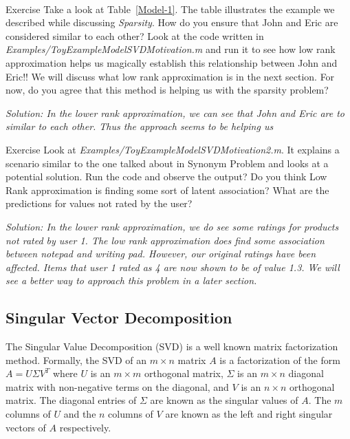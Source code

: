 \\
\begin{myremark}{Exercise }
Take a look at Table~\ref{Model-1}. The table illustrates the example we described while discussing \textit{Sparsity}. How do you ensure that John and Eric are considered similar to each other? Look at the code written in \textit{Examples/ToyExampleModelSVDMotivation.m} and run it to see how low rank approximation helps us magically establish this relationship between John and Eric!! We will discuss what low rank approximation is in the next section.  For now, do you agree that this method is helping us with the sparsity problem? 
\end{myremark}
\textit{Solution: In the lower rank approximation, we can see that John and Eric are to similar to each other. Thus the approach seems to be helping us}

\begin{myremark}{Exercise }
Look at \textit{Examples/ToyExampleModelSVDMotivation2.m}. It explains a scenario similar to the one talked about in Synonym Problem and looks at a potential solution. Run the code and observe the output? Do you think Low Rank approximation is finding some sort of latent association? What are the predictions for values not rated by the user?
\end{myremark}
\textit{Solution: In the lower rank approximation, we do see some ratings for products not rated by user 1. The low rank approximation does find some association between notepad and writing pad. However, our original ratings have been affected. Items that user 1 rated as 4 are now shown to be of value 1.3. We will see a better way to approach this problem in a later section.}
  \subsection{Singular Vector Decomposition}

The Singular Value Decomposition (SVD) is a well known matrix factorization method. Formally, the SVD of an $m \times n$ matrix $A$ is a factorization of the form $A = U \Sigma V^{T}$ where $U$ is an $m \times m$ orthogonal matrix, $\Sigma$ is an $m \times n$ diagonal matrix with non-negative terms on the diagonal, and $V$ is an $n \times n$ orthogonal matrix. The diagonal entries of $\Sigma$ are known as the singular values of $A$. The $m$ columns of $U$ and the $n$ columns of $V$ are known as the left and right singular vectors of $A$ respectively. 

